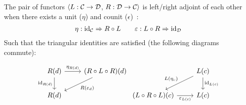 \begin{definition}
  The pair of functors $\langle L: \mathcal{C}\to \mathcal{D}$, $R: \mathcal{D}\to \mathcal{C}\rangle$ is left/right adjoint of
  each other when there exists a unit ($\eta$) and counit
  ($\epsilon$)~\parencite{leinster:basic_category_theory}:
  \[
    \begin{gathered}
      \eta: \mathrm{id}_{\mathcal{C}} \Rightarrow R \circ L
    \end{gathered}
    \qquad
    \begin{gathered}
      \varepsilon: L \circ R \Rightarrow \mathrm{id}_{\mathcal{D}}
    \end{gathered}
  \]
  Such that the triangular identities are satisfied (the following diagrams
  commute):

  \[\begin{tikzcd}[ampersand replacement=\&]
    {R(d)} \& {(R\circ L\circ R)(d)} \\
    {R(d)}
    \arrow["{\eta_{R(d)}}", from=1-1, to=1-2]
    \arrow["{R(\varepsilon_d)}", from=1-2, to=2-1]
    \arrow["{\id_{R(d)}}"', from=1-1, to=2-1]
  \end{tikzcd}
  \begin{tikzcd}[ampersand replacement=\&]
    \& {L(c)} \\
    {(L\circ R\circ L)(c)} \& {L(c)}
    \arrow["{L(\eta_c)}"', from=1-2, to=2-1]
    \arrow["{\varepsilon_{L(c)}}"', from=2-1, to=2-2]
    \arrow["{\id_{L(c)}}", from=1-2, to=2-2]
  \end{tikzcd}
  \]
\end{definition}

